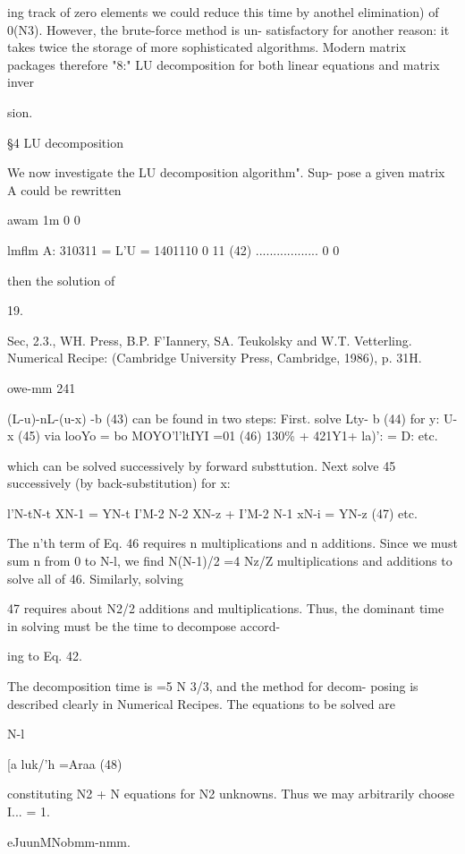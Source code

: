 {{{{{{{{ing track of zero elements we could reduce this time by anothel
elimination) of 0(N3). However, the brute-force method is un-
satisfactory for another reason: it takes twice the storage of more
sophisticated algorithms. Modern matrix packages therefore "8:"
LU decomposition for both linear equations and matrix inver~

sion.

 

\S4 LU decomposition

We now investigate the LU decomposition algorithm". Sup-
pose a given matrix A could be rewritten

awam 1m 0 0 }lmflm
A: 310311 = L'U = 1401110 0  11 (42)
.................. 0 0

then the solution of

 

19.

Sec, 2.3., WH. Press, B.P. F'Iannery, SA. Teukolsky and W.T. Vetterling. Numerical Recipe:
(Cambridge University Press, Cambridge, 1986), p. 31H.

owe-mm 241

(L-u)-nL-(u-x) -b (43)
can be found in two steps: First. solve
Lty- b (44)
for
y: U-x (45)
via
looYo = bo
MOYO'l'ltIYI =01 (46)
130\% + 421Y1+ la)': = D:
etc.

which can be solved successively by forward substtution. Next
solve 45 successively (by back-substitution) for x:

l'N-tN-t XN-1 = YN-t
I'M-2 N-2 XN-z + I'M-2 N-1 xN-i = YN-z (47)
etc.

The n'th term of Eq. 46 requires n multiplications and n additions.
Since we must sum n from 0 to N-l, we find N(N-1)/2 =4 Nz/Z
multiplications and additions to solve all of 46. Similarly, solving

47 requires about N2/2 additions and multiplications. Thus, the
dominant time in solving must be the time to decompose accord-

ing to Eq. 42.

The decomposition time is =5 N 3/3, and the method for decom-
posing is described clearly in Numerical Recipes. The equations
to be solved are

N-l

[a luk/'h =Araa (48)

constituting N2 + N equations for N2 unknowns. Thus we may
arbitrarily choose I... = 1.

eJuunMNobmm-nmm.

}}}}}}}
